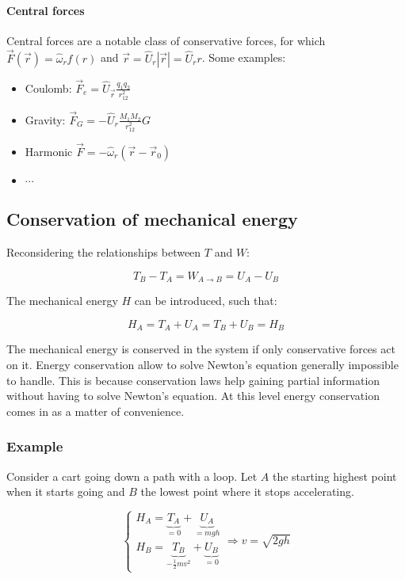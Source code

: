       \paragraph{Central forces}
      Central forces are a notable class of conservative forces, for which $\vec{F}(\vec{r}) = \hat{\omega}_{r}f(r)$ and $\vec{r} = \hat{U}_{r}|\vec{r}| = \hat{U}_{r}r$.
      Some examples:

      \begin{multicols}{2}
        \begin{itemize}
          \item Coulomb: $\vec{F}_e = \hat{U}_{\vec{r}}\frac{q_1q_2}{r_{12}^2}$
          \item Gravity: $\vec{F}_G = -\hat{U}_r\frac{M_1M_2}{r_{12}^2}G$
          \item Harmonic $\vec{F} = -\hat{\omega}_r(\vec{r}-\vec{r}_0)$
          \item $\cdots$
        \end{itemize}
      \end{multicols}

  \subsection{Conservation of mechanical energy}
  Reconsidering the relationships between $T$ and $W$:

  $$T_B-T_A = W_{A\rightarrow B} = U_A-U_B$$

  The mechanical energy $H$ can be introduced, such that:

  $$H_A = T_A+U_A = T_B+U_B = H_B$$

  The mechanical energy is conserved in the system if only conservative forces act on it.
  Energy conservation allow to solve Newton's equation generally impossible to handle.
  This is because conservation laws help gaining partial information without having to solve Newton's equation.
  At this level energy conservation comes in as a matter of convenience.

    \subsubsection{Example}
    Consider a cart going down a path with a loop.
    Let $A$ the starting highest point when it starts going and $B$ the lowest point where it stops accelerating.

    $$\begin{cases}H_A = \underbrace{T_A}_{=0}+\underbrace{U_A}_{=mgh}\\
    H_B = \underbrace{T_B}_{-\frac{1}{2}mv^2}+\underbrace{U_B}_{=0}\end{cases}
    \Rightarrow v = \sqrt{2gh}$$

